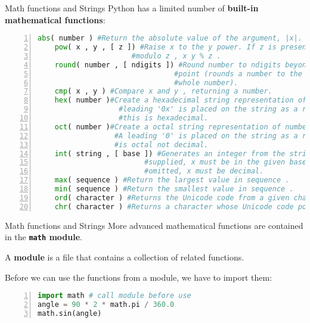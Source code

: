 \begin{frame}[fragile]{Math functions and Strings}
Python has a limited number of {\bf built-in mathematical functions}:
    \begin{lstlisting}[numbers=left,showstringspaces=false,language=python]
    abs( number ) #Return the absolute value of the argument, |x|.
    pow( x , y , [ z ]) #Raise x to the y power. If z is present, this is done 
                      #modulo z , x y % z .
    round( number , [ ndigits ]) #Round number to ndigits beyond the decimal 
                                #point (rounds a number to the nearest 
                                #whole number).
    cmp( x , y ) #Compare x and y , returning a number.     
    hex( number )#Create a hexadecimal string representation of number . A 
                   #leading '0x' is placed on the string as a reminder that 
                   #this is hexadecimal.
    oct( number )#Create a octal string representation of number .
                  #A leading '0' is placed on the string as a reminder that this
                  #is octal not decimal. 
    int( string , [ base ]) #Generates an integer from the string x . If base is
                         #supplied, x must be in the given base. If base is 
                         #omitted, x must be decimal.
    max( sequence ) #Return the largest value in sequence .
    min( sequence ) #Return the smallest value in sequence .
    ord( character ) #Returns the Unicode code from a given character. 
    chr( character ) #Returns a character whose Unicode code point is an integer.
    \end{lstlisting}      
\end{frame}
\begin{frame}[fragile]{Math functions and Strings}
More advanced mathematical functions are contained in the {\bf \verb|math| module}.


A {\bf module} is a file that contains a collection of related functions.

Before we can use the functions from a module, we have to import them:
\begin{lstlisting}[numbers=left,showstringspaces=false,language=python]
import math # call module before use
angle = 90 * 2 * math.pi / 360.0
math.sin(angle)
\end{lstlisting}
\end{frame}
